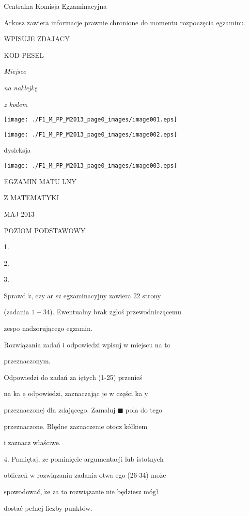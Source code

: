 \documentclass[a4paper,12pt]{article}
\begin{document}
Centralna Komisja Egzaminacyjna

Arkusz zawiera informacje prawnie chronione do momentu rozpoczęcia egzaminu.

WPISUJE ZDAJACY

KOD PESEL

{\it Miejsce}

{\it na naklejkę}

{\it z kodem}
\begin{center}
\texttt{[image: ./F1\_M\_PP\_M2013\_page0\_images/image001.eps]}

\texttt{[image: ./F1\_M\_PP\_M2013\_page0\_images/image002.eps]}
\end{center}
\fbox{} dysleksja
\begin{center}
\texttt{[image: ./F1\_M\_PP\_M2013\_page0\_images/image003.eps]}
\end{center}
EGZAMIN MATU LNY

Z MATEMATYKI

MAJ 2013

POZIOM PODSTAWOWY

1.

2.

3.

Sprawd $\acute{\mathrm{z}}$, czy ar sz egzaminacyjny zawiera 22 strony

(zadania $1-34$). Ewentualny brak zgłoś przewodniczącemu

zespo nadzorującego egzamin.

Rozwiązania zadań i odpowiedzi wpisuj w miejscu na to

przeznaczonym.

Odpowiedzi do zadań za iętych (1-25) przenieś

na ka ę odpowiedzi, zaznaczając je w części ka $\mathrm{y}$

przeznaczonej dla zdającego. Zamaluj $\blacksquare$ pola do tego

przeznaczone. Błędne zaznaczenie otocz kółkiem

i zaznacz właściwe.

4. Pamiętaj, $\dot{\mathrm{z}}\mathrm{e}$ pominięcie argumentacji lub istotnych

obliczeń w rozwiązaniu zadania otwa ego (26-34) $\mathrm{m}\mathrm{o}\dot{\mathrm{z}}\mathrm{e}$

spowodować, $\dot{\mathrm{z}}\mathrm{e}$ za to rozwiązanie nie będziesz mógł

dostać pełnej liczby punktów.
\end{document}
